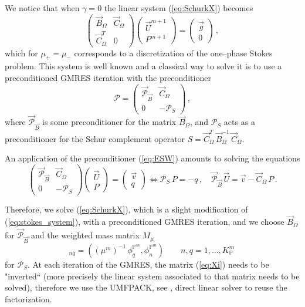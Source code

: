 \documentclass[a4paper,12pt,onecolumn]{article}
\newcommand{\pspace}{\mathbb{P}}
\begin{document}
We notice that when $\gamma = 0$ the linear system (\ref{eq:SchurkX}) becomes
\begin{equation} \label{eq:stokes_system}
\begin{pmatrix}
\vec B_\Omega & \vec C_\Omega \\
\vec C_\Omega^T & 0 
\end{pmatrix}
\begin{pmatrix}
\vec U^{m+1} \\ P^{m+1} 
\end{pmatrix}
= \begin{pmatrix}
\vec g \\
0
\end{pmatrix}\,,
\end{equation}
which for $\mu_+=\mu_-$ corresponds to a discretization of the one--phase Stokes problem. This system is well known and a classical way to solve it is to use a preconditioned GMRES iteration with the preconditioner
\begin{equation} \label{eq:ESW}
\mathcal{P} = \begin{pmatrix}
\vec{\mathcal{P}}_{\vec B} & \vec C_\Omega \\
0 & -\mathcal{P}_S
\end{pmatrix}\,,
\end{equation}
where $\vec{\mathcal{P}}_{\vec B}$ is some preconditioner for the matrix $\vec B_\Omega$, and $\mathcal{P}_S$ acts as a preconditioner for the Schur complement operator $S=\vec C^T_\Omega \,\vec B_\Omega^{-1}\,\vec C_\Omega$. 

An application of the preconditioner (\ref{eq:ESW}) amounts to solving the equations
\begin{equation*} 
\begin{pmatrix}
\vec{\mathcal{P}}_{\vec B} & \vec C_\Omega \\
0 & -\mathcal{P}_S
\end{pmatrix}
\begin{pmatrix} \vec U \\ P \end{pmatrix}
= \begin{pmatrix} \vec v \\ q \end{pmatrix}
\iff
\mathcal{P}_S\,P = -q\,,\quad \vec{\mathcal{P}}_{\vec B}\,\vec U = \vec v - \vec C_\Omega\,P\,.
\end{equation*}

Therefore, we solve (\ref{eq:SchurkX}), which is a slight modification of (\ref{eq:stokes_system}), with a preconditioned GMRES iteration, and we choose $\vec B_\Omega$  for $\vec{\mathcal{P}}_{\vec B}$ and the weighted mass matrix $ M_\mu$ 
\begin{equation*} 
[M_\mu]_{nq} = \left((\mu^m)^{-1}\,\phi_q^{\pspace^m}, \phi_n^{\pspace^m}\right) \qquad n,q = 1 ,\ldots, K_\pspace^m\,
\end{equation*}
for $\mathcal{P}_S$.
At each iteration of the GMRES, the matrix (\ref{eq:Xi}) needs to be "inverted`` (more precisely the linear system associated to that matrix needs to be solved), therefore we use the UMFPACK, see \cite{UMFPACK,suitesparse-web-page}, direct linear solver to reuse the factorization.
\end{document}
